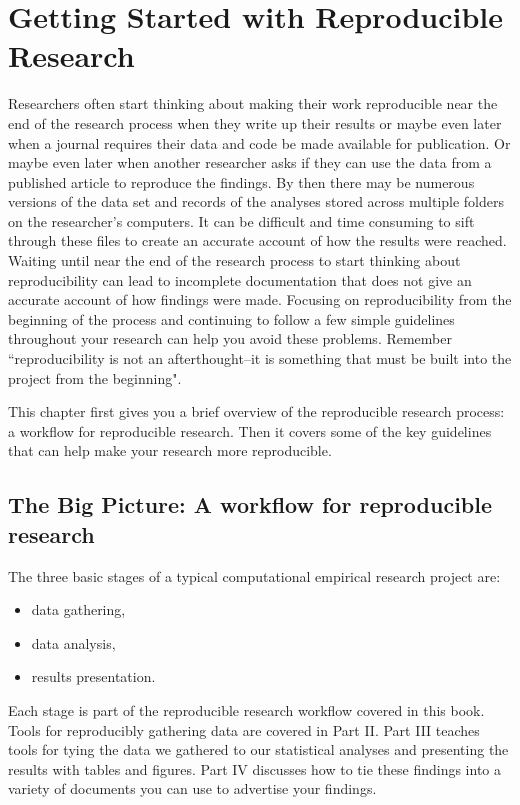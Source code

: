\documentclass[krantz1]{krantz}
\begin{document}
\chapter{Getting Started with Reproducible Research}\label{GettingStartedRR}

Researchers often start thinking about making their work reproducible near the end of the research process when they write up their results or maybe even later when a journal requires their data and code be made available for publication. Or maybe even later when another researcher asks if they can use the data from a published article to reproduce the findings. By then there may be numerous versions of the data set and records of the analyses stored across multiple folders on the researcher's computers. It can be difficult and time consuming to sift through these files to create an accurate account of how the results were reached. Waiting until near the end of the research process to start thinking about reproducibility can lead to incomplete documentation that does not give an accurate account of how findings were made. Focusing on reproducibility from the beginning of the process and continuing to follow a few simple guidelines throughout your research can help you avoid these problems. Remember ``reproducibility is not an afterthought--it is something that must be built into the project from the beginning"\cite[386]{Donohue2010}.

This chapter first gives you a brief overview of the reproducible research process: a workflow for reproducible research. Then it covers some of the key guidelines that can help make your research more reproducible.

\section{The Big Picture: A workflow for reproducible research}

The three basic stages of a typical computational empirical research project are:

\begin{itemize}
    \item data gathering,
    \item data analysis,
    \item results presentation.
\end{itemize}

\noindent Each stage is part of the reproducible research workflow covered in this book. Tools for reproducibly gathering data are covered in Part II. Part III teaches tools for tying the data we gathered to our statistical analyses and presenting the results with tables and figures. Part IV discusses how to tie these findings into a variety of documents you can use to advertise your findings.
\end{document}
